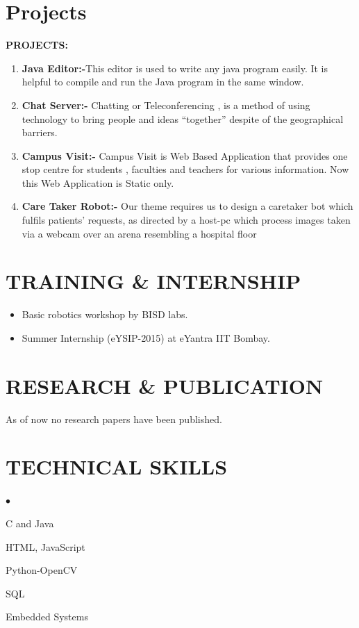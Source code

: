 \documentclass[margin,line]{res}
\newenvironment{list2}{
	\begin{list}{$\bullet$}{%
			\setlength{\itemsep}{0in}
			\setlength{\parsep}{0in} \setlength{\parskip}{0in}
			\setlength{\topsep}{0in} \setlength{\partopsep}{0in}
			\setlength{\leftmargin}{0.3in}}}{\end{list}}
\begin{document}
\begin{resume}
		\section{\sc \bf Projects}
	\textbf{PROJECTS:}
	\begin{enumerate}
		\item \textbf{Java Editor:-}This editor is used to write any java program easily. It is helpful to compile and run the Java program in the same window.
		\item \textbf{Chat Server:-}  Chatting or Teleconferencing , is a method of using technology to bring people and ideas “together” despite of the geographical
		barriers.  
		\item \textbf{Campus Visit:-} Campus Visit is Web Based Application that provides one stop centre for students , faculties and teachers for    various information. Now this Web Application is Static only.
		\item \textbf{Care Taker Robot:-} Our theme requires us to design a caretaker bot which fulfils patients’ requests, as
		directed by a host-pc which process images taken via a webcam over an arena resembling a
		hospital floor
	\end{enumerate}
		
		\section{\sc \bf TRAINING \& INTERNSHIP}
	 \begin{itemize}
	 	\item Basic robotics workshop by BISD labs.
	 	\item Summer Internship (eYSIP-2015) at eYantra IIT Bombay.
	 \end{itemize}
		
		\section{\sc \bf RESEARCH \& PUBLICATION}
		As of now no research papers have been published.
		
		\section{\sc \bf TECHNICAL SKILLS}
		\begin{list2}
			\item C and Java
			\item HTML, JavaScript
			\item Python-OpenCV 
			\item SQL
			\item Embedded Systems
		\end{list2}
		

\end{resume}
\end{document}
